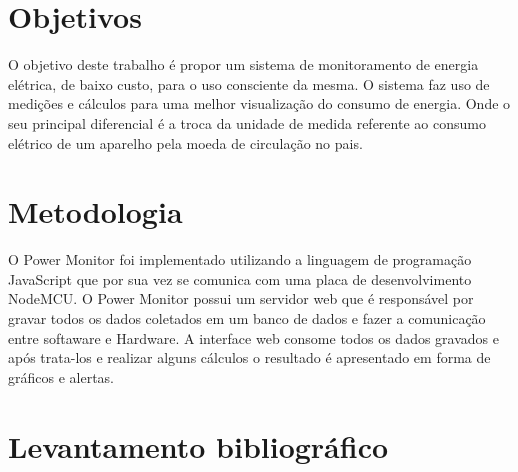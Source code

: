 \section{Objetivos}
O objetivo deste trabalho é propor um sistema de monitoramento de energia elétrica, de baixo custo, para o uso consciente da mesma. 
O sistema faz uso de medições e cálculos para uma melhor visualização do consumo de energia. Onde o seu principal diferencial é a troca da unidade de medida 
referente ao consumo elétrico de um aparelho pela moeda de circulação no pais.


\section{Metodologia}
O Power Monitor foi implementado utilizando a linguagem de programação JavaScript que por sua vez se comunica com uma placa de desenvolvimento NodeMCU. 
O Power Monitor possui um servidor web que é responsável por gravar todos os dados coletados em um banco de dados e fazer a comunicação entre softaware e Hardware. 
A interface web consome todos os dados gravados e após trata-los e realizar alguns cálculos o resultado é apresentado em forma de gráficos e alertas.


\section{Levantamento bibliográfico}

